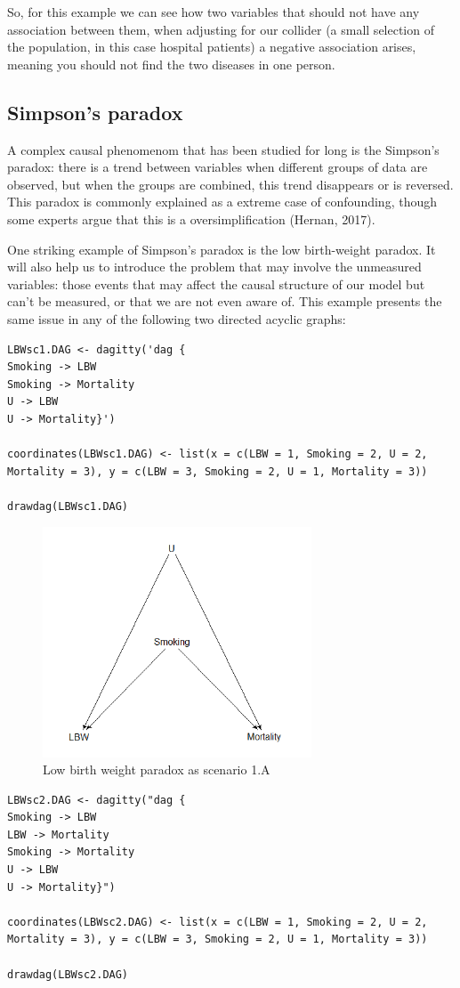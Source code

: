 \documentclass{article}
\begin{document}
So, for this example we can see how two variables that should not have any association between them, when adjusting for our collider (a small selection of the population, in this case hospital patients) a negative association arises, meaning you should not find the two diseases in one person.\par


\subsection{Simpson's paradox}

A complex causal phenomenom that has been studied for long is the Simpson's paradox: there is a trend between variables when different groups of data are observed, but when the groups are combined, this trend disappears or is reversed. This paradox is commonly explained as a extreme case of confounding, though some experts argue that this is a oversimplification (Hernan, 2017).\par
One striking example of Simpson's paradox is the low birth-weight paradox. It will also help us to introduce the problem that may involve the unmeasured variables: those events that may affect the causal structure of our model but can't be measured, or that we are not even aware of. This example presents the same issue in any of the following two directed acyclic graphs:
\begin{lstlisting}
LBWsc1.DAG <- dagitty('dag {
Smoking -> LBW
Smoking -> Mortality
U -> LBW
U -> Mortality}')

coordinates(LBWsc1.DAG) <- list(x = c(LBW = 1, Smoking = 2, U = 2, Mortality = 3), y = c(LBW = 3, Smoking = 2, U = 1, Mortality = 3))

drawdag(LBWsc1.DAG)
\end{lstlisting}
\begin{figure}[h]
\caption{Low birth weight paradox as scenario 1.A}
\includegraphics[width=8cm]{LBW1DAG.png}
\centering
\end{figure}
\newpage
\begin{lstlisting}
LBWsc2.DAG <- dagitty("dag {
Smoking -> LBW
LBW -> Mortality
Smoking -> Mortality
U -> LBW
U -> Mortality}")

coordinates(LBWsc2.DAG) <- list(x = c(LBW = 1, Smoking = 2, U = 2, Mortality = 3), y = c(LBW = 3, Smoking = 2, U = 1, Mortality = 3))

drawdag(LBWsc2.DAG)
\end{lstlisting}
\end{document}
